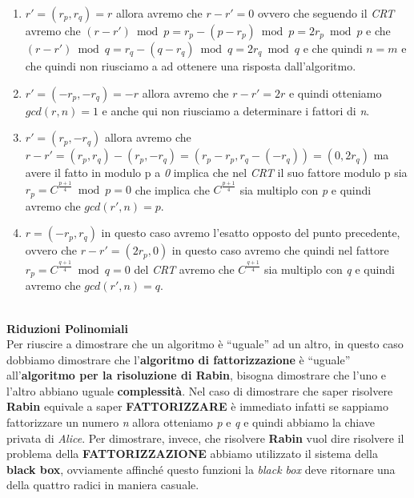 \begin{enumerate}
    \item $r' = (r_p, r_q) = r$ allora avremo che $r - r' = 0$ ovvero che seguendo il \textit{CRT} avremo che $(r - r') \bmod p = r_p - (p - r_p) \bmod p = 2r_p \bmod p$ e che $(r -r') \bmod q = r_q - (q - r_q) \bmod q = 2r_q \bmod q$ e che quindi $n = m$ e che quindi non riusciamo a ad ottenere una risposta dall'algoritmo.
    \item $r' = (-r_p, -r_q) = -r$ allora avremo che $r - r' = 2r$ e quindi otteniamo $gcd(r, n) = 1$ e anche qui non riusciamo a determinare i fattori di \textit{n}.
    \item $r' = (r_p, - r_q)$ allora avremo che $r - r' = (r_p, r_q) - (r_p, - r_q) = (r_p - r_p, r_q - (- r_q)) = (0, 2r_q)$ ma avere il fatto in modulo p a \textit{0} implica che nel \textit{CRT} il suo fattore modulo p sia $r_p = C^{\frac{p + 1}{4}} \bmod p = 0$ che implica che $C^{\frac{p + 1}{4}}$ sia multiplo con \textit{p} e quindi avremo che $gcd(r', n) = p$.
    \item $r = (-r_p, r_q)$ in questo caso avremo l'esatto opposto del punto precedente, ovvero che $r - r' = (2r_p, 0)$ in questo caso avremo che quindi nel fattore $r_p = C^{\frac{q + 1}{4}} \bmod q = 0$ del \textit{CRT} avremo che $C^{\frac{q + 1}{4}}$ sia multiplo con \textit{q} e quindi avremo che $gcd(r', n) = q$.
\end{enumerate}
\   \\
\textbf{Riduzioni Polinomiali} \\
Per riuscire a dimostrare che un algoritmo è ``uguale'' ad un altro, in questo caso dobbiamo dimostrare che l'\textbf{algoritmo di fattorizzazione} è ``uguale'' all'\textbf{algoritmo per la risoluzione di Rabin}, bisogna dimostrare che l'uno e l'altro abbiano uguale \textbf{complessità}. Nel caso di dimostrare che saper risolvere \textbf{Rabin} equivale a saper \textbf{FATTORIZZARE} è immediato infatti se sappiamo fattorizzare un  numero \textit{n} allora otteniamo \textit{p} e \textit{q} e quindi abbiamo la chiave privata di \textit{Alice}. Per dimostrare, invece, che risolvere \textbf{Rabin} vuol dire risolvere il problema della \textbf{FATTORIZZAZIONE} abbiamo utilizzato il sistema della \textbf{black box}, ovviamente affinché questo funzioni la \textit{black box} deve ritornare una della quattro radici in maniera casuale.